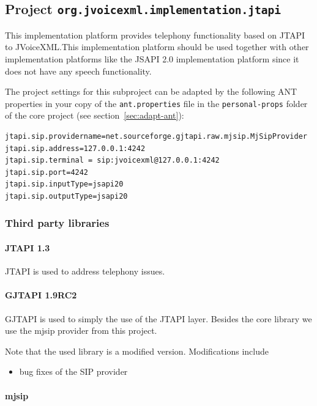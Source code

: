 \documentclass[11pt,a4paper]{article}
\begin{document}
\subsection{Project \texttt{org.jvoicexml.implementation.jtapi}}

This implementation platform provides telephony functionality based on JTAPI to
JVoiceXML.This implementation platform should be used together with other
implementation platforms like the JSAPI 2.0 implementation platform since it
does not have any speech functionality.

The project settings for this subproject can be adapted by the following ANT
properties in your copy of the \texttt{ant.properties} file in the
\texttt{personal-props} folder of the core project (see 
section~\ref{sec:adapt-ant}):
\begin{lstlisting}
jtapi.sip.providername=net.sourceforge.gjtapi.raw.mjsip.MjSipProvider
jtapi.sip.address=127.0.0.1:4242
jtapi.sip.terminal = sip:jvoicexml@127.0.0.1:4242
jtapi.sip.port=4242
jtapi.sip.inputType=jsapi20
jtapi.sip.outputType=jsapi20
\end{lstlisting}

\subsubsection{Third party libraries}
\label{sec:jtapi-third-party-libr}

\paragraph{JTAPI 1.3}

JTAPI is used to address telephony issues.

\paragraph{GJTAPI 1.9RC2}

GJTAPI is used to simply the use of the JTAPI layer. Besides the core library
we use the mjsip provider from this project.

Note that the used library is a modified version. Modifications include
\begin{itemize}
\item bug fixes of the SIP provider
\end{itemize}

\paragraph{mjsip}
\end{document}
